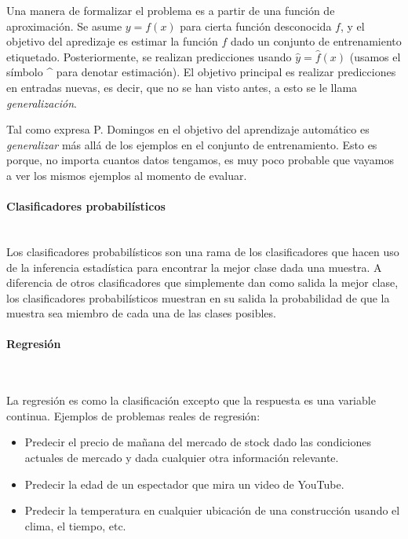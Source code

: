 		Una manera de formalizar el problema es a partir de una función de aproximación. Se asume $y = f(x)$ para cierta función desconocida $f$, y el objetivo del apredizaje es estimar la función $f$ dado un conjunto de entrenamiento etiquetado. Posteriormente, se realizan predicciones usando $\hat{y} = \hat{f}(x)$ (usamos el símbolo \string^ para denotar estimación). El objetivo principal es realizar predicciones en entradas nuevas, es decir, que no se han visto antes, a esto se le llama \textit{generalización}.
		
		Tal como expresa P. Domingos en \cite{PDomingo} el objetivo del aprendizaje automático es \textit{generalizar} más allá de los ejemplos en el conjunto de entrenamiento. Esto es porque, no importa cuantos datos tengamos, es muy poco probable que vayamos a ver los mismos ejemplos al momento de evaluar.
		
	\paragraph{Clasificadores probabilísticos} ~\\

		Los clasificadores probabilísticos son una rama de los clasificadores que hacen uso de la inferencia estadística para encontrar la mejor clase dada una muestra. A diferencia de otros clasificadores que simplemente dan como salida la mejor clase, los clasificadores probabilísticos muestran en su salida la probabilidad de que la muestra sea miembro de cada una de las clases posibles.


	\paragraph{Regresión} ~\\
	
	
		La regresión es como la clasificación excepto que la respuesta es una variable continua. Ejemplos de problemas reales de regresión:
		\begin{itemize}
			\item Predecir el precio de mañana del mercado de stock dado las condiciones actuales de mercado y dada cualquier otra información relevante.
			\item Predecir la edad de un espectador que mira un video de YouTube.
			\item Predecir la temperatura en cualquier ubicación de una construcción usando el clima, el tiempo, etc.
		\end{itemize}
	
